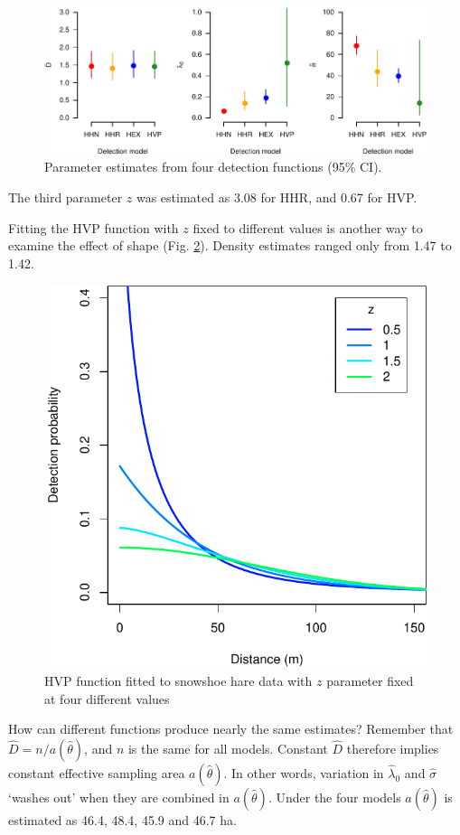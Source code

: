 \documentclass[
]{book}
\begin{document}
\begin{figure}
\centering
\includegraphics{SECRbook_files/figure-latex/choicedfparmplot-1.pdf}
\caption{\label{fig:choicedfparmplot}Parameter estimates from four detection functions (95\% CI).}
\end{figure}

The third parameter \(z\) was estimated as 3.08 for HHR, and
0.67 for HVP.

Fitting the HVP function with \(z\) fixed to different values is another way to examine the effect of shape (Fig. \ref{fig:HVPvaryzplot}). Density estimates ranged only from 1.47 to 1.42.

\begin{figure}
\includegraphics[width=0.6\linewidth]{SECRbook_files/figure-latex/HVPvaryzplot-1} \caption{HVP function fitted to snowshoe hare data with $z$ parameter fixed at four different values}\label{fig:HVPvaryzplot}
\end{figure}

How can different functions produce nearly the same estimates? Remember that \hyperref[esa]{\(\hat D = n/a(\hat \theta)\)}, and \(n\) is the same for all models. Constant \(\hat D\) therefore implies constant effective sampling area \(a(\hat \theta)\). In other words, variation in \(\hat \lambda_0\) and \(\hat \sigma\) `washes out' when they are combined in \(a(\hat \theta)\). Under the four models \(a(\hat \theta)\) is estimated as 46.4, 48.4, 45.9 and 46.7 ha.
\end{document}
